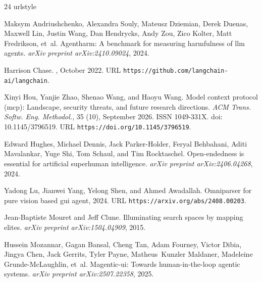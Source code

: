 \begin{thebibliography}{24}
\providecommand{\natexlab}[1]{#1}
\providecommand{\url}[1]{\texttt{#1}}
\expandafter\ifx\csname urlstyle\endcsname\relax
  \providecommand{\doi}[1]{doi: #1}\else
  \providecommand{\doi}{doi: \begingroup \urlstyle{rm}\Url}\fi

Maksym Andriushchenko, Alexandra Souly, Mateusz Dziemian, Derek Duenas, Maxwell Lin, Justin Wang, Dan Hendrycks, Andy Zou, Zico Kolter, Matt Fredrikson, et~al.
\newblock Agentharm: A benchmark for measuring harmfulness of llm agents.
\newblock \emph{arXiv preprint arXiv:2410.09024}, 2024.

Harrison Chase.
, October 2022.
\newblock URL \url{https://github.com/langchain-ai/langchain}.

Xinyi Hou, Yanjie Zhao, Shenao Wang, and Haoyu Wang.
\newblock Model context protocol (mcp): Landscape, security threats, and future research directions.
\newblock \emph{ACM Trans. Softw. Eng. Methodol.}, 35 (10), September 2026.
\newblock ISSN 1049-331X.
\newblock \doi{10.1145/3796519}.
\newblock URL \url{https://doi.org/10.1145/3796519}.

Edward Hughes, Michael Dennis, Jack Parker-Holder, Feryal Behbahani, Aditi Mavalankar, Yuge Shi, Tom Schaul, and Tim Rocktaschel.
\newblock Open-endedness is essential for artificial superhuman intelligence.
\newblock \emph{arXiv preprint arXiv:2406.04268}, 2024.

Yadong Lu, Jianwei Yang, Yelong Shen, and Ahmed Awadallah.
\newblock Omniparser for pure vision based gui agent, 2024.
\newblock URL \url{https://arxiv.org/abs/2408.00203}.

Jean-Baptiste Mouret and Jeff Clune.
\newblock Illuminating search spaces by mapping elites.
\newblock \emph{arXiv preprint arXiv:1504.04909}, 2015.

Hussein Mozannar, Gagan Bansal, Cheng Tan, Adam Fourney, Victor Dibia, Jingya Chen, Jack Gerrits, Tyler Payne, Matheus~Kunzler Maldaner, Madeleine Grunde-McLaughlin, et~al.
\newblock Magentic-ui: Towards human-in-the-loop agentic systems.
\newblock \emph{arXiv preprint arXiv:2507.22358}, 2025.


\end{thebibliography}
